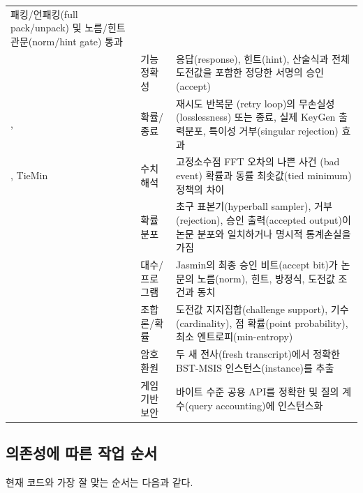 \begin{longtable}{L{0.28\textwidth}L{0.18\textwidth}L{0.46\textwidth}}
패킹/언패킹(full pack/unpack) 및 노름/힌트 관문(norm/hint gate) 통과 \\
 & 기능정확성 & 응답(response), 힌트(hint),
산술식과 전체 도전값을 포함한 정당한 서명의 승인(accept) \\
,  & 확률/종료 & 재시도 반복문
(retry loop)의 무손실성(losslessness) 또는 종료, 실제 KeyGen 출력분포, 특이성
거부(singular rejection) 효과 \\
, TieMin & 수치해석 & 고정소수점 FFT 오차의 나쁜 사건
(bad event) 확률과 동률 최솟값(tied minimum) 정책의 차이 \\
 & 확률분포 & 초구 표본기(hyperball sampler),
거부(rejection), 승인 출력(accepted output)이 논문 분포와 일치하거나 명시적
통계손실을 가짐 \\
 & 대수/프로그램 & Jasmin의 최종 승인 비트(accept bit)가
논문의 노름(norm), 힌트, 방정식, 도전값 조건과 동치 \\
 & 조합론/확률 & 도전값 지지집합(challenge support),
기수(cardinality), 점 확률(point probability), 최소 엔트로피(min-entropy) \\
 & 암호 환원 & 두 새 전사(fresh transcript)에서 정확한
BST-MSIS 인스턴스(instance)를 추출 \\
 & 게임 기반 보안 & 바이트 수준 공용 API를 정확한
 및 질의 계수(query accounting)에 인스턴스화 \\
\bottomrule
\end{longtable}

\subsection{의존성에 따른 작업 순서}

현재 코드와 가장 잘 맞는 순서는 다음과 같다.

